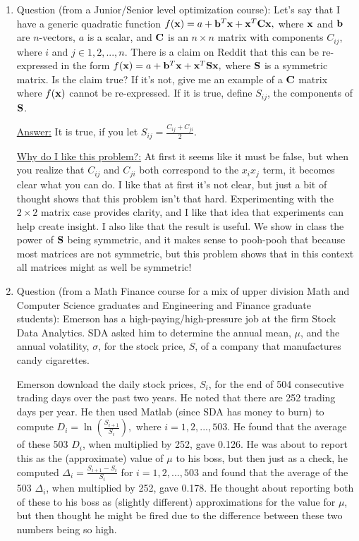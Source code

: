 \documentclass[12pt]{article}
\begin{document}
\begin{enumerate}
\item Question (from a Junior/Senior level optimization course): Let's say that I have a generic quadratic function $f({\bf x}) = a + {\bf b}^T{\bf x} + {\bf x}^T{\bf C}{\bf x},$ where ${\bf x}$ and ${\bf b}$ are $n$-vectors, $a$ is a scalar, and ${\bf C}$ is an $n \times n$ matrix with components $C_{ij}$, where $i$ and $j \in {1,2,...,n}$.  There is a claim on Reddit that this can be re-expressed in the form $f({\bf x}) = a + {\bf b}^T{\bf x} + {\bf x}^T{\bf S}{\bf x},$ where ${\bf S}$ is a symmetric matrix.  Is the claim true? If it's not, give me an example of a ${\bf C}$ matrix where $f({\bf x})$ cannot be re-expressed.  If it is true, define $S_{ij}$, the components of ${\bf S}$.

\underline{Answer:} It is true, if you let $S_{ij} = \frac{C_{ij} + C_{ji}}{2}$. 

\underline{Why do I like this problem?:}  At first it seems like it must be false, but when you realize that $C_{ij}$ and $C_{ji}$ both correspond to the $x_ix_j$ term, it becomes clear what you can do. I like that at first it's not clear, but just a bit of thought shows that this problem isn't that hard. Experimenting with the $2 \times 2$ matrix case provides clarity, and I like that idea that experiments can help create insight. I also like that the result is useful. We show in class the power of ${\bf S}$ being symmetric, and it makes sense to pooh-pooh that because most matrices are not symmetric, but this problem shows that in this context all matrices might as well be symmetric!


\item Question (from a Math Finance course for a mix of upper division Math and Computer Science graduates and Engineering and Finance graduate students): Emerson has a high-paying/high-pressure job at the firm Stock Data Analytics.  SDA asked him to determine the annual mean, $\mu$, and the annual volatility, $\sigma$, for the stock price, $S$, of a company that manufactures candy cigarettes.

Emerson download the daily stock prices, $S_i$, for the end of 504 consecutive trading days over the past two years.  He noted that there are 252 trading days per year.  He then used Matlab (since SDA has money to burn) to compute $D_i = \ln\left(\frac{S_{i+1}}{S_i}\right),$ where $i=1,2,...,503$.  He found that the average of these 503 $D_i$, when multiplied by 252, gave 0.126.   He was about to report this as the (approximate) value of $\mu$ to his boss, but then just as a check, he computed $\Delta_i = \frac{S_{i+1} - S_i}{S_i}$ for $i=1,2,...,503$ and found that the average of the 503 $\Delta_i$, when multiplied by 252, gave 0.178.  He thought about reporting both of these to his boss as (slightly different) approximations for the value for $\mu$, but then thought he might be fired due to the difference between these two numbers being so high.


\end{enumerate}
\end{document}
